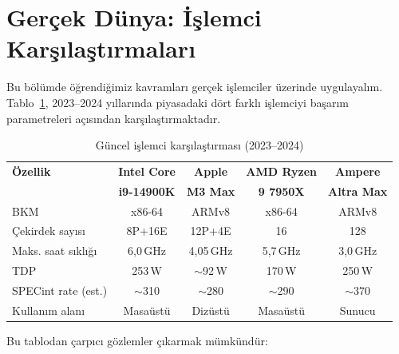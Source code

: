 \section{Gerçek Dünya: İşlemci Karşılaştırmaları}
\label{sec:gercek-dunya-basarim}

Bu bölümde öğrendiğimiz kavramları gerçek işlemciler üzerinde uygulayalım. Tablo~\ref{tab:islemci-karsilastirma}, 2023--2024 yıllarında piyasadaki dört farklı işlemciyi başarım parametreleri açısından karşılaştırmaktadır.

\begin{table}[H]
\centering
\caption{Güncel işlemci karşılaştırması (2023--2024)}
\label{tab:islemci-karsilastirma}
\small
\begin{tabular}{lcccc}
\toprule
\textbf{Özellik} & \textbf{Intel Core} & \textbf{Apple} & \textbf{AMD Ryzen} & \textbf{Ampere} \\
                  & \textbf{i9-14900K}  & \textbf{M3 Max} & \textbf{9 7950X} & \textbf{Altra Max} \\
\midrule
BKM               & x86-64    & ARMv8     & x86-64    & ARMv8     \\
Çekirdek sayısı   & 8P+16E   & 12P+4E   & 16        & 128       \\
Maks. saat sıklığı & 6,0\,GHz & 4,05\,GHz & 5,7\,GHz & 3,0\,GHz \\
TDP               & 253\,W   & $\sim$92\,W & 170\,W  & 250\,W   \\
SPECint rate (est.) & $\sim$310 & $\sim$280 & $\sim$290 & $\sim$370 \\
Kullanım alanı    & Masaüstü & Dizüstü  & Masaüstü  & Sunucu    \\
\bottomrule
\end{tabular}
\end{table}

Bu tablodan çarpıcı gözlemler çıkarmak mümkündür:

